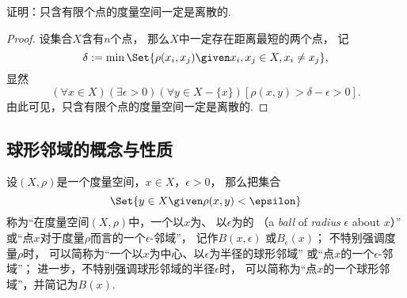 \begin{example}
证明：只含有限个点的度量空间一定是离散的.
\begin{proof}
设集合\(X\)含有\(n\)个点，
那么\(X\)中一定存在距离最短的两个点，
记\begin{equation*}
	\delta \defeq \min\Set{
		\rho(x_i,x_j)
		\given
		x_i,x_j \in X,
		x_i \neq x_j
	},
\end{equation*}
显然\begin{equation*}
	(\forall x \in X)
	(\exists \epsilon > 0)
	(\forall y \in X - \{x\})
	[
		\rho(x,y) > \delta - \epsilon > 0
	].
\end{equation*}
由此可见，只含有限个点的度量空间一定是离散的.
\end{proof}
\end{example}

\subsection{球形邻域的概念与性质}
\begin{definition}\label{definition:度量空间.球形邻域的概念}
设\((X,\rho)\)是一个度量空间，\(x \in X\)，\(\epsilon > 0\)，
那么把集合\begin{equation*}
	\Set{ y \in X \given \rho(x,y) < \epsilon }
\end{equation*}
称为“在度量空间\((X,\rho)\)中，一个以\(x\)为、
以\(\epsilon\)为的%
（a \emph{ball} of \emph{radius} \(\epsilon\) about \(x\)）”
或“点\(x\)对于度量\(\rho\)而言的一个\(\epsilon\)-邻域”，
记作\(B(x,\epsilon)\)
或\(B_{\epsilon}(x)\)；
不特别强调度量\(\rho\)时，
可以简称为“一个以\(x\)为中心、以\(\epsilon\)为半径的球形邻域”
或“点\(x\)的一个\(\epsilon\)-邻域”；
进一步，不特别强调球形邻域的半径\(\epsilon\)时，
可以简称为“点\(x\)的一个球形邻域”，并简记为\(B(x)\).
\end{definition}

